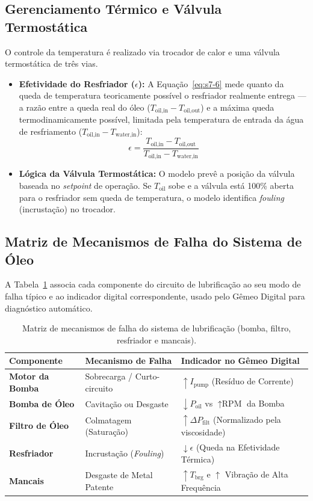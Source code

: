 \documentclass[12pt,a4paper]{article}
\numberwithin{equation}{section}
\numberwithin{table}{section}
\numberwithin{figure}{section}
\begin{document}
	\subsection{\textbf{Gerenciamento Térmico e Válvula Termostática}}
	O controle da temperatura é realizado via trocador de calor e uma válvula termostática de três vias.
	\begin{itemize}
		\item \textbf{Efetividade do Resfriador ($\epsilon$):} A Equação~\eqref{eq:s7-6} mede quanto da queda de temperatura teoricamente possível o resfriador realmente entrega — a razão entre a queda real do óleo ($T_{\text{oil,in}} - T_{\text{oil,out}}$) e a máxima queda termodinamicamente possível, limitada pela temperatura de entrada da água de resfriamento ($T_{\text{oil,in}} - T_{\text{water,in}}$):
		\begin{equation}\label{eq:s7-6}
 \epsilon = \frac{T_{\text{oil,in}} - T_{\text{oil,out}}}{T_{\text{oil,in}} - T_{\text{water,in}}}
\end{equation}
		\item \textbf{Lógica da Válvula Termostática:} O modelo prevê a posição da válvula baseada no \textit{setpoint} de operação. Se $T_{\text{oil}}$ sobe e a válvula está 100\% aberta para o resfriador sem queda de temperatura, o modelo identifica \textit{fouling} (incrustação) no trocador.
	\end{itemize}
	
	\subsection{\textbf{Matriz de Mecanismos de Falha do Sistema de Óleo}}
	A Tabela~\ref{tab:7-1} associa cada componente do circuito de lubrificação ao seu modo de falha típico e ao indicador digital correspondente, usado pelo Gêmeo Digital para diagnóstico automático.
	\begin{table}[h!tbp]
		\centering
		\small
		\renewcommand{\arraystretch}{1.5}
		\begin{tabular}{l l l}
			\toprule
			\textbf{Componente} & \textbf{Mecanismo de Falha} & \textbf{Indicador no Gêmeo Digital} \\ \midrule
			\textbf{Motor da Bomba} & Sobrecarga / Curto-circuito & $\uparrow I_{\text{pump}}$ (Resíduo de Corrente) \\
			\textbf{Bomba de Óleo} & Cavitação ou Desgaste & $\downarrow P_{\text{oil}}$ vs $\uparrow \text{RPM}$ da Bomba \\
			\textbf{Filtro de Óleo} & Colmatagem (Saturação) & $\uparrow \Delta P_{\text{filt}}$ (Normalizado pela viscosidade) \\
			\textbf{Resfriador} & Incrustação (\textit{Fouling}) & $\downarrow \epsilon$ (Queda na Efetividade Térmica) \\
			\textbf{Mancais} & Desgaste de Metal Patente & $\uparrow T_{\text{brg}}$ e $\uparrow$ Vibração de Alta Frequência \\ \bottomrule
		\end{tabular}
		\caption[Mecanismos de falha do sistema de lubrificação]{Matriz de mecanismos de falha do sistema de lubrificação (bomba, filtro, resfriador e mancais).}
		\label{tab:7-1}
	\end{table}
	
\end{document}
